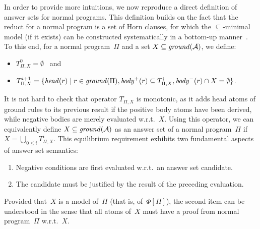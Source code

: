 In order to provide more intuitions,
we now reproduce a direct definition of answer sets for normal programs.
This definition builds on the fact that the reduct for a normal program
is a set of Horn clauses, for which the $\subseteq$-minimal model (if it exists) can be constructed
systematically in a bottom-up manner~\cite{dowgal84a}.
To this end, for a normal program~$\Pi$ and a set $X\subseteq\mathit{ground}(\mathcal{A})$,
we define:
\begin{itemize}
\item $T^0_{\Pi,X} = \emptyset$ ~and
\item $T^{i+1}_{\Pi,X} = \{\mathit{head}(r) \mid 
                        r\in\mathit{ground}(\Pi),
                        \mathit{body}^+(r)\subseteq T^i_{\Pi,X},
                        \mathit{body}^-(r)\cap X=\emptyset\}$.
\end{itemize}
It is not hard to check that operator $T_{\Pi,X}$ is monotonic,
as it adds head atoms of ground rules to its previous result if the positive
body atoms have been derived,
while negative bodies are merely evaluated w.r.t.~$X$.
Using this operator, we can equivalently define $X\subseteq\mathit{ground}(\mathcal{A})$
as an answer set of a normal program~$\Pi$ if $X=\bigcup_{0\leq i}T^i_{\Pi,X}$.
This equilibrium requirement exhibits two fundamental aspects of answer set semantics:
\begin{enumerate}
\item Negative conditions are first evaluated w.r.t.\ an answer set candidate.
\item The candidate must be justified by the result of the preceding evaluation.
\end{enumerate}
Provided that~$X$ is a model of~$\Pi$ (that is, of~$\Phi[\Pi]$),
the second item can be understood in the sense that all atoms of~$X$
must have a proof from normal program~$\Pi$ w.r.t.~$X$.

